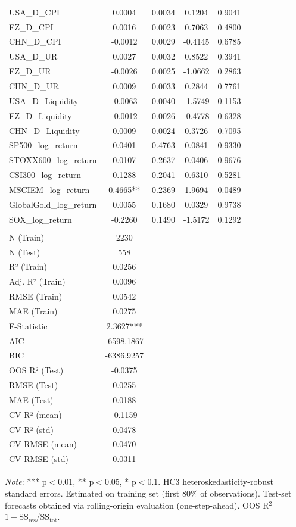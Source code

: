 \begin{tabular}{lcccc}
  USA\_D\_CPI & 0.0004 & 0.0034 & 0.1204 & 0.9041 \\ 
  EZ\_D\_CPI & 0.0016 & 0.0023 & 0.7063 & 0.4800 \\ 
  CHN\_D\_CPI & -0.0012 & 0.0029 & -0.4145 & 0.6785 \\ 
  USA\_D\_UR & 0.0027 & 0.0032 & 0.8522 & 0.3941 \\ 
  EZ\_D\_UR & -0.0026 & 0.0025 & -1.0662 & 0.2863 \\ 
  CHN\_D\_UR & 0.0009 & 0.0033 & 0.2844 & 0.7761 \\ 
  USA\_D\_Liquidity & -0.0063 & 0.0040 & -1.5749 & 0.1153 \\ 
  EZ\_D\_Liquidity & -0.0012 & 0.0026 & -0.4778 & 0.6328 \\ 
  CHN\_D\_Liquidity & 0.0009 & 0.0024 & 0.3726 & 0.7095 \\ 
  SP500\_log\_return & 0.0401 & 0.4763 & 0.0841 & 0.9330 \\ 
  STOXX600\_log\_return & 0.0107 & 0.2637 & 0.0406 & 0.9676 \\ 
  CSI300\_log\_return & 0.1288 & 0.2041 & 0.6310 & 0.5281 \\ 
  MSCIEM\_log\_return & 0.4665** & 0.2369 & 1.9694 & 0.0489 \\ 
  GlobalGold\_log\_return & 0.0055 & 0.1680 & 0.0329 & 0.9738 \\ 
  SOX\_log\_return & -0.2260 & 0.1490 & -1.5172 & 0.1292 \\ 
   &  &  &  &  \\ 
  N (Train) & 2230 &  &  &  \\ 
  N (Test) & 558 &  &  &  \\ 
  R² (Train) & 0.0256 &  &  &  \\ 
  Adj. R² (Train) & 0.0096 &  &  &  \\ 
  RMSE (Train) & 0.0542 &  &  &  \\ 
  MAE (Train) & 0.0275 &  &  &  \\ 
  F-Statistic & 2.3627*** &  &  &  \\ 
  AIC & -6598.1867 &  &  &  \\ 
  BIC & -6386.9257 &  &  &  \\ 
  OOS R² (Test) & -0.0375 &  &  &  \\ 
  RMSE (Test) & 0.0255 &  &  &  \\ 
  MAE (Test) & 0.0188 &  &  &  \\ 
  CV R² (mean) & -0.1159 &  &  &  \\ 
  CV R² (std) & 0.0478 &  &  &  \\ 
  CV RMSE (mean) & 0.0470 &  &  &  \\ 
  CV RMSE (std) & 0.0311 &  &  &  \\ 
  \bottomrule
\end{tabular}
\par\vspace{4pt}
\begin{minipage}{\linewidth}
  \footnotesize \textit{Note}: *** p$<$0.01, ** p$<$0.05, * p$<$0.1. HC3 heteroskedasticity-robust standard errors. Estimated on training set (first 80\% of observations). Test-set forecasts obtained via rolling-origin evaluation (one-step-ahead). OOS R$^2$ = $1 - \text{SS}_{\text{res}} / \text{SS}_{\text{tot}}$.
\end{minipage}